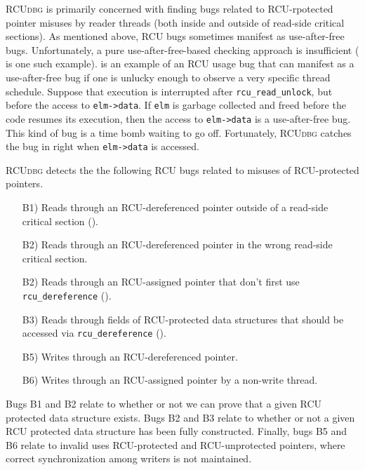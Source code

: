 \documentclass[preprint]{sigplanconf}
\newcommand{\toolname}[1]{{\scshape #1}}
\begin{document}
\toolname{RCUdbg} is primarily concerned with finding bugs related to RCU-rpotected pointer misuses by reader threads (both inside and outside of read-side critical sections). As mentioned above, RCU bugs sometimes manifest as use-after-free bugs. Unfortunately, a pure use-after-free-based checking approach is insufficient ( is one such example).  is an example of an RCU usage bug that can manifest as a use-after-free bug if one is unlucky enough to observe a very specific thread schedule. Suppose that execution is interrupted after \texttt{rcu\_read\_unlock}, but before the access to \texttt{elm->data}. If \texttt{elm} is garbage collected and freed before the code resumes its execution, then the access to \texttt{elm->data} is a use-after-free bug. This kind of bug is a time bomb waiting to go off. Fortunately, \toolname{RCUdbg} catches the bug in  right when \texttt{elm->data} is accessed.




\toolname{RCUdbg} detects the the following RCU bugs related to misuses of RCU-protected pointers.
\begin{itemize}[leftmargin=3.2em]
	\item[B1)] Reads through an RCU-dereferenced pointer outside of a read-side critical section ().
	\item[B2)] Reads through an RCU-dereferenced pointer in the wrong read-side critical section.

	\item[B2)] Reads through an RCU-assigned pointer that don't first use \texttt{rcu\_dereference} ().
	\item[B3)] Reads through fields of RCU-protected data structures that should be accessed via \texttt{rcu\_dereference} ().
	
	\item[B5)] Writes through an RCU-dereferenced pointer.
	\item[B6)] Writes through an RCU-assigned pointer by a non-write thread.
\end{itemize}

Bugs B1 and B2 relate to whether or not we can prove that a given RCU protected data structure exists. Bugs B2 and B3 relate to whether or not a given RCU protected data structure has been fully constructed. Finally, bugs B5 and B6 relate to invalid uses RCU-protected and RCU-unprotected pointers, where correct synchronization among writers is not maintained.
\end{document}
